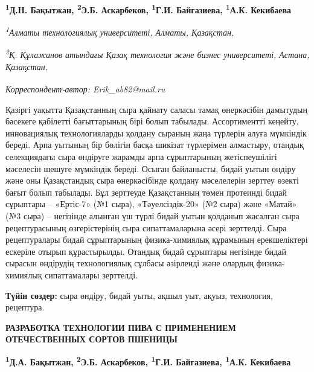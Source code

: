 
\begin{articleheader}

{\bfseries
\textsuperscript{1}Д.Н. Бақытжан,
\textsuperscript{2}Э.Б. Аскарбеков\textsuperscript{\envelope },
\textsuperscript{1}Г.И. Байгазиева,
\textsuperscript{1}А.К. Кекибаева}
\end{articleheader}

\begin{affiliation}
\emph{\textsuperscript{1}Алматы технологиялық университеті, Алматы, Қазақстан,}

\emph{\textsuperscript{2}Қ. Құлажанов атындағы Қазақ технология және бизнес университеті, Астана, Қазақстан,}

\raggedright \textsuperscript{\envelope }{\em Корреспондент-автор: Erik\_ab82@mail.ru}
\end{affiliation}

Қазіргі уақытта Қазақстанның сыра қайнату саласы тамақ өнеркәсібін
дамытудың бәсекеге қабілетті бағыттарының бірі болып табылады.
Ассортиментті кеңейту, инновациялық технологияларды қолдану сыраның жаңа
түрлерін алуға мүмкіндік береді. Арпа уытының бір бөлігін басқа шикізат
түрлерімен алмастыру, отандық селекциядағы сыра өндіруге жарамды арпа
сұрыптарының жетіспеушілігі мәселесін шешуге мүмкіндік береді. Осыған
байланысты, бидай уытын өндіру және оны Қазақстандық сыра өнеркәсібінде
қолдану мәселелерін зерттеу өзекті бағыт болып табылады. Бұл зерттеуде
Қазақстанның төмен протеинді бидай сұрыптары -- «Ертіс-7» (№1 сыра),
«Тәуелсіздік-20» (№2 сыра) және «Матай» (№3 сыра) -- негізінде алынған
үш түрлі бидай уытын қолданып жасалған сыра рецептурасының
өзгерістерінің сыра сипаттамаларына әсері зерттелді. Сыра рецептуралары
бидай сұрыптарының физика-химиялық құрамының ерекшеліктері ескеріле
отырып құрастырылды. Отандық бидай сұрыптары негізінде бидай сырасын
өндірудің технологиялық сұлбасы әзірленді және олардың физика-химиялық
сипаттамалары зерттелді.

{\bfseries Түйін сөздер:} сыра өндіру, бидай уыты, ақшыл уыт, ақуыз,
технология, рецептура.

\begin{articleheader}
{\bfseries РАЗРАБОТКА ТЕХНОЛОГИИ ПИВА С ПРИМЕНЕНИЕМ ОТЕЧЕСТВЕННЫХ СОРТОВ ПШЕНИЦЫ}

{\bfseries
\textsuperscript{1}Д.А. Бақытжан,
\textsuperscript{2}Э.Б. Аскарбеков\textsuperscript{\envelope },
\textsuperscript{1}Г.И. Байгазиева,
\textsuperscript{1}А.К. Кекибаева}
\end{articleheader}

